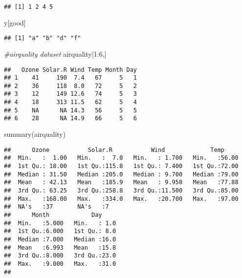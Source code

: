 \documentclass[
]{article}
\newenvironment{Shaded}{\begin{snugshade}}{\end{snugshade}}
\newcommand{\CommentTok}[1]{\textcolor[rgb]{0.56,0.35,0.01}{\textit{#1}}}
\newcommand{\DecValTok}[1]{\textcolor[rgb]{0.00,0.00,0.81}{#1}}
\newcommand{\FunctionTok}[1]{\textcolor[rgb]{0.00,0.00,0.00}{#1}}
\newcommand{\NormalTok}[1]{#1}
\newcommand{\SpecialCharTok}[1]{\textcolor[rgb]{0.00,0.00,0.00}{#1}}
\begin{document}
\begin{verbatim}
## [1] 1 2 4 5
\end{verbatim}

\begin{Shaded}
\begin{Highlighting}[]
\NormalTok{y[good]}
\end{Highlighting}
\end{Shaded}

\begin{verbatim}
## [1] "a" "b" "d" "f"
\end{verbatim}

\begin{Shaded}
\begin{Highlighting}[]
\CommentTok{\#airquality dataset}
\NormalTok{airquality[}\DecValTok{1}\SpecialCharTok{:}\DecValTok{6}\NormalTok{,]}
\end{Highlighting}
\end{Shaded}

\begin{verbatim}
##   Ozone Solar.R Wind Temp Month Day
## 1    41     190  7.4   67     5   1
## 2    36     118  8.0   72     5   2
## 3    12     149 12.6   74     5   3
## 4    18     313 11.5   62     5   4
## 5    NA      NA 14.3   56     5   5
## 6    28      NA 14.9   66     5   6
\end{verbatim}

\begin{Shaded}
\begin{Highlighting}[]
\FunctionTok{summary}\NormalTok{(airquality)}
\end{Highlighting}
\end{Shaded}

\begin{verbatim}
##      Ozone           Solar.R           Wind             Temp      
##  Min.   :  1.00   Min.   :  7.0   Min.   : 1.700   Min.   :56.00  
##  1st Qu.: 18.00   1st Qu.:115.8   1st Qu.: 7.400   1st Qu.:72.00  
##  Median : 31.50   Median :205.0   Median : 9.700   Median :79.00  
##  Mean   : 42.13   Mean   :185.9   Mean   : 9.958   Mean   :77.88  
##  3rd Qu.: 63.25   3rd Qu.:258.8   3rd Qu.:11.500   3rd Qu.:85.00  
##  Max.   :168.00   Max.   :334.0   Max.   :20.700   Max.   :97.00  
##  NA's   :37       NA's   :7                                       
##      Month            Day      
##  Min.   :5.000   Min.   : 1.0  
##  1st Qu.:6.000   1st Qu.: 8.0  
##  Median :7.000   Median :16.0  
##  Mean   :6.993   Mean   :15.8  
##  3rd Qu.:8.000   3rd Qu.:23.0  
##  Max.   :9.000   Max.   :31.0  
## 
\end{verbatim}
\end{document}
